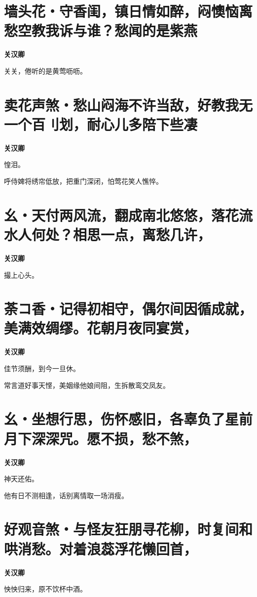 \documentclass[12pt,a4paper]{ctexbook}
\begin{document}
\section{墙头花・守香闺，镇日情如醉，闷懊恼离愁空教我诉与谁？愁闻的是紫燕}
\textbf{关汉卿}\par\vspace{0.5em}
关关，倦听的是黄莺呖呖。\par

\section{卖花声煞・愁山闷海不许当敌，好教我无一个百刂划，耐心儿多陪下些凄}
\textbf{关汉卿}\par\vspace{0.5em}
惶泪。\par
呼侍婢将绣帘低放，把重门深闭，怕莺花笑人憔悴。\par

\section{幺・天付两风流，翻成南北悠悠，落花流水人何处？相思一点，离愁几许，}
\textbf{关汉卿}\par\vspace{0.5em}
撮上心头。\par

\section{荼コ香・记得初相守，偶尔间因循成就，美满效绸缪。花朝月夜同宴赏，}
\textbf{关汉卿}\par\vspace{0.5em}
佳节须酬，到今一旦休。\par
常言道好事天悭，美姻缘他娘间阻，生拆散鸾交凤友。\par

\section{幺・坐想行思，伤怀感旧，各辜负了星前月下深深咒。愿不损，愁不煞，}
\textbf{关汉卿}\par\vspace{0.5em}
神天还佑。\par
他有日不测相逢，话别离情取一场消瘦。\par

\section{好观音煞・与怪友狂朋寻花柳，时复间和哄消愁。对着浪蕊浮花懒回首，}
\textbf{关汉卿}\par\vspace{0.5em}
怏怏归来，原不饮杯中酒。\par
\end{document}
